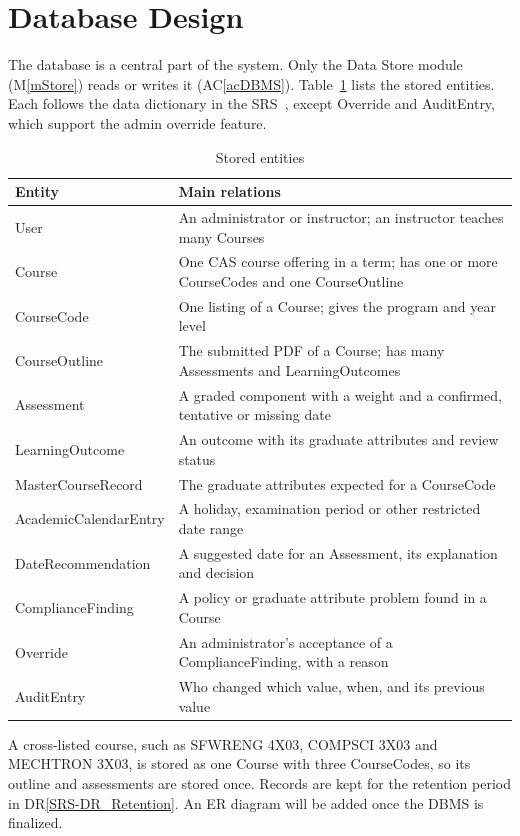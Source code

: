 \documentclass[12pt, titlepage]{article}
\newcommand{\acref}[1]{AC\ref{#1}}
\newcommand{\mref}[1]{M\ref{#1}}
\newcommand{\drref}[1]{DR\ref{SRS-#1}}
\begin{document}
\section{Database Design} \label{SecDB}

The database is a central part of the system. Only the Data Store module
(\mref{mStore}) reads or writes it (\acref{acDBMS}). Table~\ref{TblEntities}
lists the stored entities. Each follows the data dictionary in the
SRS~\citep{TeamBVSH2026SRS}, except Override and AuditEntry, which support the
admin override feature.

\begin{table}[H]
\centering
\begin{tabular}{p{} p{}}
\toprule
\textbf{Entity} & \textbf{Main relations}\\
\midrule
User & An administrator or instructor; an instructor teaches many Courses\\
Course & One CAS course offering in a term; has one or more CourseCodes and one CourseOutline\\
CourseCode & One listing of a Course; gives the program and year level\\
CourseOutline & The submitted PDF of a Course; has many Assessments and LearningOutcomes\\
Assessment & A graded component with a weight and a confirmed, tentative or missing date\\
LearningOutcome & An outcome with its graduate attributes and review status\\
MasterCourseRecord & The graduate attributes expected for a CourseCode\\
AcademicCalendarEntry & A holiday, examination period or other restricted date range\\
DateRecommendation & A suggested date for an Assessment, its explanation and decision\\
ComplianceFinding & A policy or graduate attribute problem found in a Course\\
Override & An administrator's acceptance of a ComplianceFinding, with a reason\\
AuditEntry & Who changed which value, when, and its previous value\\
\bottomrule
\end{tabular}
\caption{Stored entities}
\label{TblEntities}
\end{table}

A cross-listed course, such as SFWRENG 4X03, COMPSCI 3X03 and MECHTRON 3X03,
is stored as one Course with three CourseCodes, so its outline and assessments
are stored once. Records are kept for the retention period in
\drref{DR_Retention}. An ER diagram will be added once the DBMS is finalized.
\end{document}
